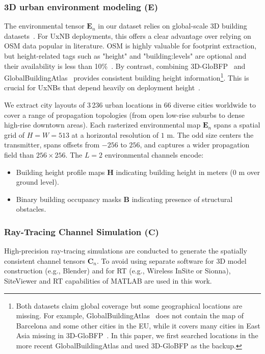 \documentclass[10pt,conference,letterpaper]{IEEEtran}
\begin{document}
\subsubsection{3D urban environment modeling ($\mathbf{E}$)}
\label{sec:env_model}
The environmental tensor $\mathbf{E}_n$ in our dataset relies on global-scale 3D building datasets~\cite{Che2024globfp,Zhu2025atlas}. For UxNB deployments, this offers a clear advantage over relying on OSM data popular in literature. OSM is highly valuable for footprint extraction, but height-related tags such as {"height"} and {"building:levels"} are optional and their availability is less than 10\%~\cite{Bernard2022}. By contrast, combining 3D-GloBFP~\cite{Che2024globfp} and GlobalBuildingAtlas~\cite{Zhu2025atlas} provides consistent building height information\footnote{Both datasets claim global coverage but some geographical locations are missing. For example, GlobalBuildingAtlas~\cite{Zhu2025atlas} does not contain the map of Barcelona and some other cities in the EU, while it covers many cities in East Asia missing in 3D-GloBFP~\cite{Che2024globfp}. In this paper, we first searched locations in the more recent GlobalBuildingAtlas and used 3D-GloBFP as the backup.}. This is crucial for UxNBs that depend heavily on deployment height~\cite{Vinogradov2018}.

We extract city layouts of 3\,236 urban locations in 66 diverse cities worldwide to cover a range of propagation topologies (from open low-rise suburbs to dense high-rise downtown areas). Each rasterized environmental map $\mathbf{E}_n$ spans a spatial grid of $H = W = 513$ at a horizontal resolution of $1\text{~m}$. The odd size centers the transmitter, spans offsets from $-256$ to $256$, and captures a wider propagation field than $256\times256$. The $L=2$ environmental channels encode:
\begin{itemize}
    \item Building height profile maps $\mathbf{H}$ indicating building height in meters ($0\text{~m}$ over ground level).
    \item Binary building occupancy masks $\mathbf{B}$ indicating presence of structural obstacles.
\end{itemize}

\subsubsection{Ray-Tracing Channel Simulation ($\mathbf{C}$)}
\label{sec:rt_sim}
High-precision ray-tracing simulations are conducted to generate the spatially consistent channel tensors $\mathbf{C}_n$. To avoid using separate software for 3D model construction (e.g., Blender) and for RT (e.g., Wireless InSite or Sionna), SiteViewer and RT capabilities of MATLAB are used in this work. %
\end{document}
